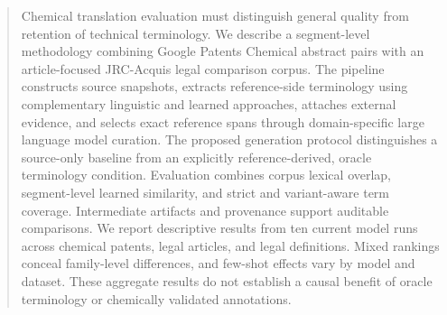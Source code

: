 \begin{abstract}
Chemical translation evaluation must distinguish general quality from retention of technical
terminology. We describe a segment-level methodology combining Google Patents Chemical abstract
pairs with an article-focused JRC-Acquis legal comparison corpus. The pipeline constructs source
snapshots, extracts reference-side terminology using complementary linguistic and learned approaches,
attaches external evidence, and selects exact reference spans through domain-specific large language
model curation. The proposed generation protocol distinguishes a source-only baseline from an
explicitly reference-derived, oracle terminology condition. Evaluation combines corpus lexical overlap,
segment-level learned similarity, and strict and variant-aware term coverage. Intermediate artifacts
and provenance support auditable comparisons. We report descriptive results from ten current model
runs across chemical patents, legal articles, and legal definitions. Mixed rankings conceal
family-level differences, and few-shot effects vary by model and dataset. These aggregate results
do not establish a causal benefit of oracle terminology or chemically validated annotations.
\end{abstract}